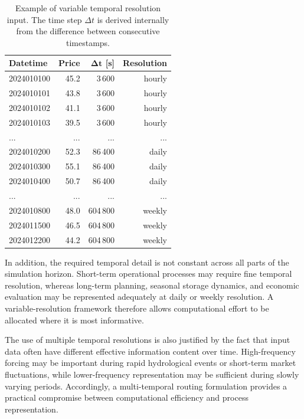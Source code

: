 \documentclass[a4paper, 12pt]{report}
\begin{document}
	
	\begin{table}[h]
	\centering
	\caption{Example of variable temporal resolution input. The time step $\Delta t$ is
		derived internally from the difference between consecutive timestamps.}
	\label{tab:variable_dt}
	\begin{tabular}{lrrr}
		\hline
		\textbf{Datetime} & \textbf{Price} & $\boldsymbol{\Delta t}$ \textbf{[s]} & \textbf{Resolution} \\
		\hline
		2024010100 & 45.2 & 3\,600  & hourly \\
		2024010101 & 43.8 & 3\,600  & hourly \\
		2024010102 & 41.1 & 3\,600  & hourly \\
		2024010103 & 39.5 & 3\,600  & hourly \\
		...  & ... & ...  & ... \\
		\hline
		2024010200 & 52.3 & 86\,400 & daily  \\
		2024010300 & 55.1 & 86\,400 & daily  \\
		2024010400 & 50.7 & 86\,400 & daily  \\
		...  & ... & ...  & ... \\
		\hline
		2024010800 & 48.0 & 604\,800 & weekly \\
		2024011500 & 46.5 & 604\,800 & weekly \\
		2024012200 & 44.2 & 604\,800 & weekly \\
		\hline
	\end{tabular}
	\end{table}
	
	In addition, the required temporal detail is not constant across all parts of the simulation horizon. 
	Short-term operational processes may require fine temporal resolution, whereas long-term planning, seasonal storage dynamics, and economic evaluation may be represented adequately at daily or weekly resolution. 
	A variable-resolution framework therefore allows computational effort to be allocated where it is most informative.

	The use of multiple temporal resolutions is also justified by the fact that input data often have different effective information content over time. High-frequency forcing may be important during rapid hydrological events or short-term market fluctuations, while lower-frequency representation may be sufficient during slowly varying periods. 
	Accordingly, a multi-temporal routing formulation provides a practical compromise between computational efficiency and process representation.
\end{document}
